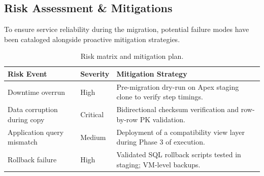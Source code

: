 \subsection{Risk Assessment \& Mitigations}
To ensure service reliability during the migration, potential failure modes have been cataloged alongside proactive mitigation strategies.

\begin{table}[ht]
\small
\centering
\begin{tabularx}{\textwidth}{L{3.5cm} C{1.8cm} Y}
\toprule
\textbf{Risk Event} & \textbf{Severity} & \textbf{Mitigation Strategy} \\
\midrule
Downtime overrun & High & Pre-migration dry-run on Apex staging clone to verify step timings. \\
Data corruption during copy & Critical & Bidirectional checksum verification and row-by-row PK validation. \\
Application query mismatch & Medium & Deployment of a compatibility view layer during Phase 3 of execution. \\
Rollback failure & High & Validated SQL rollback scripts tested in staging; VM-level backups. \\
\bottomrule
\end{tabularx}
\caption{Risk matrix and mitigation plan.}
\label{tab:risks}
\end{table}
